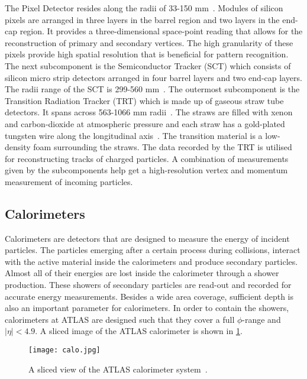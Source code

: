 The Pixel Detector resides along the radii of 33-150 mm~\cite{PERF-2015-07}. Modules of silicon pixels 
are arranged in three layers in the barrel region and two layers in the end-cap region. 
It provides a three-dimensional space-point reading that allows for the reconstruction of primary and 
secondary vertices. The high granularity of these pixels provide high spatial 
resolution that is beneficial for pattern recognition. The next subcomponent is the Semiconductor 
Tracker (SCT) which consists of silicon micro strip detectors 
arranged in four barrel layers and two end-cap layers. The radii range of the SCT is 299-560 mm~\cite{PERF-2015-07}. The 
outermost subcomponent is the Transition Radiation Tracker (TRT) which 
is made up of gaseous straw tube detectors. It spans across 563-1066 mm radii~\cite{PERF-2015-07}. The straws are filled 
with xenon and carbon-dioxide at atmospheric pressure and each straw
has a gold-plated tungsten wire along the longitudinal axis~\cite{VOGEL2013277}. The transition material is a low-density 
foam surrounding the straws. The data recorded by the TRT is utilised for reconstructing 
tracks of charged particles. A combination of measurements given by the subcomponents help get a high-resolution vertex and 
momentum measurement of incoming particles. 

\subsection{Calorimeters}
Calorimeters are detectors that are designed to measure the energy of incident particles.
The particles emerging after a certain process during collisions, interact with 
the active material inside the calorimeters and produce secondary particles. Almost all of
their energies are lost inside the calorimeter through a shower production.
These showers of secondary particles are read-out and recorded for accurate energy 
measurements. Besides a wide area coverage, sufficient depth is also an important 
parameter for calorimeters. In order to contain the showers, calorimeters at ATLAS are 
designed such that they cover a full $\phi$-range and $|\eta|<4.9$. A sliced image of the ATLAS calorimeter
is shown in \cref{fig:calo}.  

\begin{figure}[htbp]
    \centering
    \texttt{[image: calo.jpg]}
    \caption[Sketch of the ATLAS calorimeters]{A sliced view of the ATLAS calorimeter system~\cite{Pequenao:1095927}.}%
    \label{fig:calo}
\end{figure}

